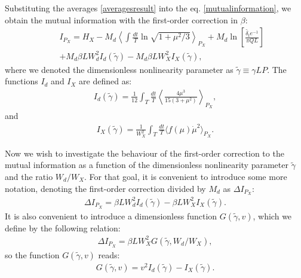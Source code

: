 \documentclass{article}
\begin{document}
Substituting the averages \eqref{averagesresult} into the eq. \eqref{mutualinformation}, we obtain the mutual information with the first-order correction in $\beta$:
\begin{eqnarray}
    &&I_{P_{X}} = H_X - M_{d}\left\langle\int\frac{dt}{T}\ln{\sqrt{1+\mu^{2}/3}}\right\rangle_{P_{X}} + M_{d}\ln\left[\frac{\tilde{\delta_{t}}e^{-1}}{\pi Q L}\right]\nonumber \\
    && + M_d\beta L W_{d}^{2} I_{d}(\tilde{\gamma}) - M_d\beta L W_{X}^{2} I_{X}(\tilde{\gamma}),
\end{eqnarray}
where we denoted the dimensionless nonlinearity parameter as $\tilde{\gamma} \equiv \gamma L P$. The functions $I_{d}$ and $I_{X}$ are defined as:
\begin{eqnarray}\label{Iddefinition}
    I_{d}(\tilde{\gamma}) = \frac{1}{12} \int_{T} \frac{dt}{T}\left\langle \frac{4 \mu^{3}}{15(3+\mu^{2})} \right\rangle_{P_{X}},
\end{eqnarray}
and 
\begin{eqnarray}\label{IXdefinition}
    I_{X}(\tilde{\gamma}) = \frac{1}{W_{X}^{2}} \int_{T} \frac{dt}{T}\langle f(\mu)\dot{\mu}^{2} \rangle_{P_{X}}. 
\end{eqnarray}

Now we wish to investigate the behaviour of the first-order correction to the mutual information as a function of the dimensionless nonlinearity parameter $\tilde{\gamma}$ and the ratio $W_{d}/W_{X}$. For that goal, it is convenient to introduce some more notation, denoting the first-order correction divided by $M_{d}$ as $\Delta I_{P_{X}}$:
\begin{eqnarray}
    \Delta I_{P_{X}} = \beta L W_{d}^{2} I_{d}(\tilde{\gamma}) - \beta L W_{X}^{2} I_{X}(\tilde{\gamma}).
\end{eqnarray}
It is also convenient to introduce a dimensionless function $G(\tilde{\gamma},v)$, which we define by the following relation:
\begin{eqnarray}
    \Delta I_{P_{X}} = \beta L W_{X}^{2}G(\tilde{\gamma}, W_{d}/W_{X}),
\end{eqnarray}
so the function $G(\tilde{\gamma}, v)$ reads: 
\begin{eqnarray}
    G(\tilde{\gamma}, v) = v^{2}I_{d}(\tilde{\gamma}) - I_{X}(\tilde{\gamma}).
\end{eqnarray}
\end{document}
